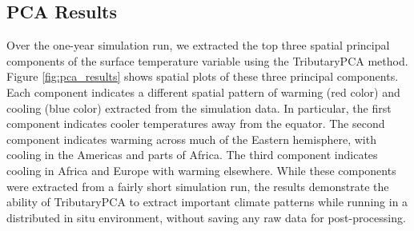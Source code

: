 \documentclass{juliacon}
\begin{document}
\subsection{PCA Results}
Over the one-year simulation run, we extracted the top three spatial principal components of the surface temperature variable using the TributaryPCA method.
Figure \ref{fig:pca_results} shows spatial plots of these three principal components. 
Each component indicates a different spatial pattern of warming (red color) and cooling (blue color) extracted from the simulation data.
In particular, the first component indicates cooler temperatures away from the equator. 
The second component indicates warming across much of the Eastern hemisphere, with cooling in the Americas and parts of Africa. 
The third component indicates cooling in Africa and Europe with warming elsewhere.
While these components were extracted from a fairly short simulation run, the results demonstrate the ability of TributaryPCA to extract important climate patterns while running in a distributed in situ environment, without saving any raw data for post-processing.
\end{document}
